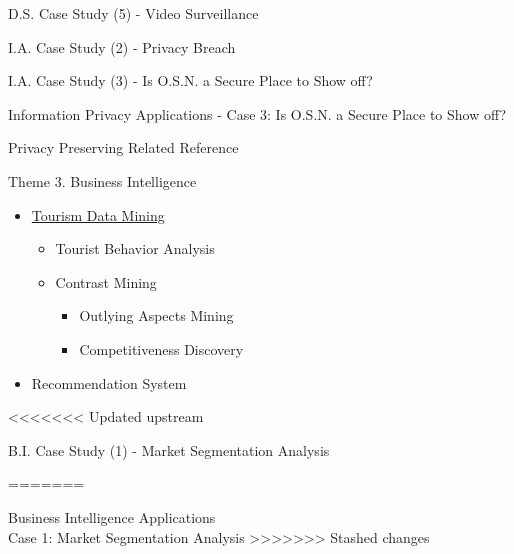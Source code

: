 \documentclass[
 size=14pt,
 paper=smartboard,  %
 mode=present, 		%
 display=slides, 	%
 style=tuliplab,  	%
 pauseslide,
 fleqn,leqno]{powerdot}
\begin{document}
\begin{slide}[toc=,bm=]{D.S. Case Study (5) - Video Surveillance}
\begin{slide}[toc=,bm=]{I.A. Case Study (2) - Privacy Breach}
\begin{slide}[toc=,bm=]{I.A. Case Study (3) - Is O.S.N. a Secure Place to Show off?}
\begin{slide}[toc=,bm=]{Information Privacy Applications - Case 3: Is O.S.N. a Secure Place to Show off?}
\end{slide}

\begin{slide}[toc=,bm=]{Privacy Preserving Related Reference}


\end{slide}


\begin{slide}[toc=,bm=]{Theme 3. Business Intelligence}


\begin{itemize}
\item
\underline {Tourism Data Mining}

\begin{itemize}
\item
Tourist Behavior Analysis

\item
Contrast Mining

\begin{itemize}
\item
Outlying Aspects Mining

\item
Competitiveness Discovery
\end{itemize}

\end{itemize}

\item
Recommendation System

\end{itemize}

\end{slide}


<<<<<<< Updated upstream
\begin{slide}[toc=,bm=]{B.I. Case Study (1) - Market Segmentation Analysis}


=======
\begin{slide}[toc=,bm=]{Business Intelligence Applications \\
\small{Case 1: Market Segmentation Analysis}}
>>>>>>> Stashed changes



\end{slide}
\end{slide}
\end{slide}
\end{slide}
\end{slide}
\end{document}
